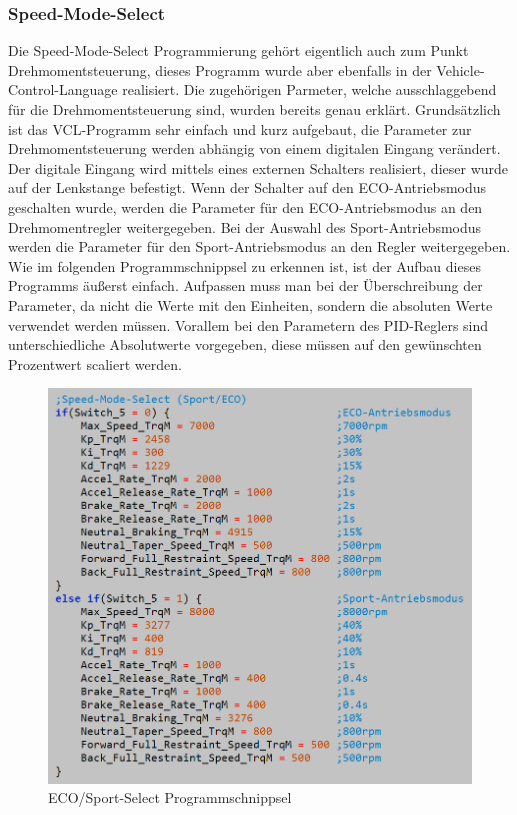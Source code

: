 \subsubsection{Speed-Mode-Select}
Die Speed-Mode-Select Programmierung gehört eigentlich auch zum Punkt Drehmomentsteuerung, dieses Programm wurde aber ebenfalls in der Vehicle-Control-Language realisiert. Die zugehörigen Parmeter, welche ausschlaggebend für die Drehmomentsteuerung sind, wurden bereits genau erklärt. Grundsätzlich ist das VCL-Programm sehr einfach und kurz aufgebaut, die Parameter zur Drehmomentsteuerung werden abhängig von einem digitalen Eingang verändert. Der digitale Eingang wird mittels eines externen Schalters realisiert, dieser wurde auf der Lenkstange befestigt. Wenn der Schalter auf den ECO-Antriebsmodus geschalten wurde, werden die Parameter für den ECO-Antriebsmodus an den Drehmomentregler weitergegeben. Bei der Auswahl des Sport-Antriebsmodus werden die Parameter für den Sport-Antriebsmodus an den Regler weitergegeben.\\ 
\vspace{5mm}
Wie im folgenden Programmschnippsel zu erkennen ist, ist der Aufbau dieses Programms äußerst einfach. Aufpassen muss man bei der Überschreibung der Parameter, da nicht die Werte mit den Einheiten, sondern die absoluten Werte verwendet werden müssen. Vorallem bei den Parametern des PID-Reglers sind unterschiedliche Absolutwerte vorgegeben, diese müssen auf den gewünschten Prozentwert scaliert werden.
\vspace{2mm}
\begin{figure}[H]
	\begin{center}
		\includegraphics[scale=0.5]{figures/antrieb/ECO_Sport_Select_Programmschnippsel.png}
		\caption{ECO/Sport-Select Programmschnippsel}
	\end{center}
\end{figure}

